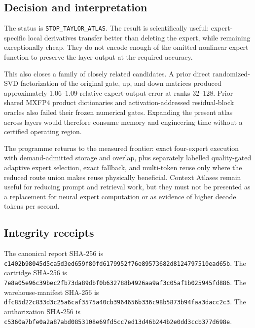 \subsection{Decision and interpretation}

The status is \texttt{STOP\_TAYLOR\_ATLAS}.  The result is scientifically useful:
expert-specific local derivatives transfer better than deleting the expert, while
remaining exceptionally cheap.  They do not encode enough of the omitted nonlinear
expert function to preserve the layer output at the required accuracy.

This also closes a family of closely related candidates.  A prior direct randomized-
SVD factorization of the original gate, up, and down matrices produced approximately
1.06--1.09 relative expert-output error at ranks 32--128.  Prior shared MXFP4 product
dictionaries and activation-addressed residual-block oracles also failed their
frozen numerical gates.  Expanding the present atlas across layers would therefore
consume memory and engineering time without a certified operating region.

The programme returns to the measured frontier: exact four-expert execution with
demand-admitted storage and overlap, plus separately labelled quality-gated adaptive
expert selection, exact fallback, and multi-token reuse only where the reduced route
union makes reuse physically beneficial.  Context Atlases remain useful for reducing
prompt and retrieval work, but they must not be presented as a replacement for neural
expert computation or as evidence of higher decode tokens per second.

\subsection{Integrity receipts}

The canonical report SHA-256 is
\texttt{c1402b98045d5ca5d3ed659f80fd6179952f76e89573682d8124797510ead65b}.
The cartridge SHA-256 is
\texttt{7e8a05e96c39bec2fb73da89dbf0b632788b4926aa9af3c05af1b025945fd886}.
The warehouse-manifest SHA-256 is
\texttt{dfc85d22c833d3c25a6caf3575a40cb3964656b336c98b5873b94faa3dacc2c3}.
The authorization SHA-256 is
\texttt{c5360a7bfe0a2a87abd0853108e69fd5cc7ed13d46b244b2e0dd3ccb377d698e}.
